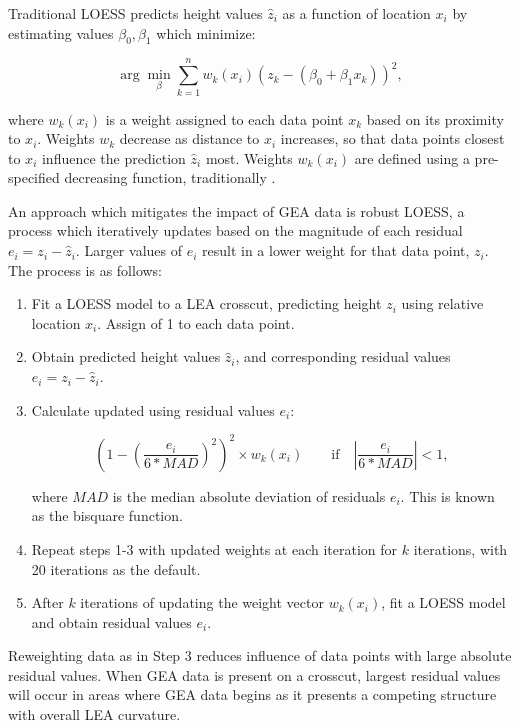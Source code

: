 \documentclass[12pt]{article}
\begin{document}
Traditional LOESS predicts height values \(\widehat{z}_i\) as a function
of location \(x_i\) by estimating values \(\beta_0, \beta_1\) which
minimize:

\[ \arg\min_{\beta} \sum_{k=1}^n w_k(x_i) (z_k - (\beta_0 + \beta_1x_k))^2,\]

where \(w_k(x_i)\) is a weight assigned to each data point \(x_k\) based
on its proximity to \(x_i\). Weights \(w_k\) decrease as distance to
\(x_i\) increases, so that data points closest to \(x_i\) influence the
prediction \(\widehat{z}_i\) most. Weights \(w_k(x_i)\) are defined
using a pre-specified decreasing function, traditionally
.

An approach which mitigates the impact of GEA data is robust LOESS, a
process which iteratively updates  based on the
magnitude of each residual \(e_i = z_i - \widehat{z}_i\). Larger values
of \(e_i\) result in a lower weight for that data point, \(z_i\). The
process is as follows:

\begin{enumerate}

\item Fit a LOESS model to a LEA crosscut, predicting height $z_i$ using relative location $x_i$. Assign  of 1 to each data point.  
\item Obtain predicted height values $\widehat{z}_i$, and corresponding residual values $e_i = z_i - \widehat{z}_i$. 
\item Calculate updated  using residual values $e_i$: 

$$\left(1 - \left(\frac{e_i}{6*MAD}\right)^2\right)^2 \times w_k(x_i) \quad \quad \mbox{if}\quad \left|\frac{e_i}{6*MAD} \right| < 1,$$

where $MAD$ is the median absolute deviation of residuals $e_i$. This is known as the bisquare function.  
\item Repeat steps 1-3 with updated weights at each iteration for $k$ iterations, with 20 iterations as the default.  
\item After $k$ iterations of updating the weight vector $w_k(x_i)$, fit a LOESS model and obtain residual values $e_i$.  

\end{enumerate}

Reweighting data as in Step 3 reduces influence of data points with
large absolute residual values. When GEA data is present on a crosscut,
largest residual values will occur in areas where GEA data begins as it
presents a competing structure with overall LEA curvature.
\end{document}
